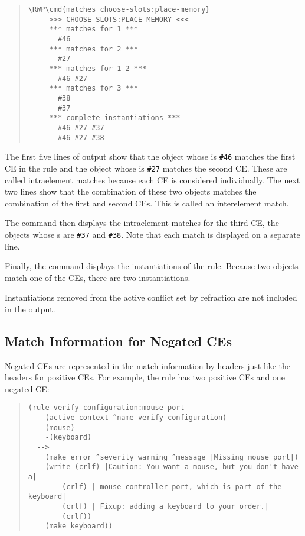 \begin{quote}
\begin{Verbatim}[commandchars=\\\{\}]
\RWP\cmd{matches choose-slots:place-memory}
     >>> CHOOSE-SLOTS:PLACE-MEMORY <<<
     *** matches for 1 ***
       #46
     *** matches for 2 ***
       #27
     *** matches for 1 2 ***
       #46 #27
     *** matches for 3 ***
       #38
       #37
     *** complete instantiations ***
       #46 #27 #37
       #46 #27 #38
\end{Verbatim}
\end{quote}

The first five lines of output show that the object whose
 is \verb|#46| matches the first CE in the rule and
the object whose  is \verb|#27| matches the second
CE. These are called intraelement matches because each CE is
considered individually. The next two lines show that the combination
of these two objects matches the combination of the first and second
CEs. This is called an interelement match.

The  command then displays the intraelement matches for
the third CE, the objects whose s are \verb|#37| and
\verb|#38|.  Note that each match is displayed on a separate line.

Finally, the command displays the instantiations of the rule.  Because
two objects match one of the CEs, there are two instantiations.

Instantiations removed from the active conflict set by refraction are
not included in the  output.

\subsection{Match Information for Negated CEs}

Negated CEs are represented in the match information by headers just
like the headers for positive CEs. For example, the rule
 has two positive CEs and one
negated CE:

\begin{quote}
\begin{verbatim}
(rule verify-configuration:mouse-port
    (active-context ^name verify-configuration)
    (mouse)
    -(keyboard)
  -->
    (make error ^severity warning ^message |Missing mouse port|)
    (write (crlf) |Caution: You want a mouse, but you don't have a|
        (crlf) | mouse controller port, which is part of the keyboard|
        (crlf) | Fixup: adding a keyboard to your order.|
        (crlf))
    (make keyboard))
\end{verbatim}
\end{quote}

